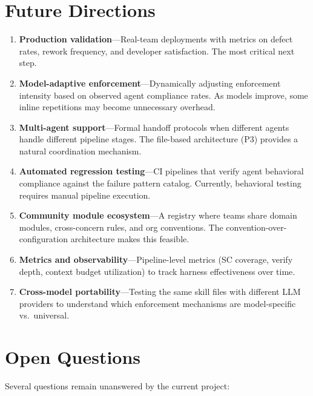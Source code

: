 \documentclass[11pt,a4paper,openright,twoside]{report}
\begin{document}
\section{Future Directions}

\begin{enumerate}
  \item \textbf{Production validation}---Real-team deployments with metrics on defect rates, rework frequency, and developer satisfaction. The most critical next step.
  \item \textbf{Model-adaptive enforcement}---Dynamically adjusting enforcement intensity based on observed agent compliance rates. As models improve, some inline repetitions may become unnecessary overhead.
  \item \textbf{Multi-agent support}---Formal handoff protocols when different agents handle different pipeline stages. The file-based architecture (P3) provides a natural coordination mechanism.
  \item \textbf{Automated regression testing}---CI pipelines that verify agent behavioral compliance against the failure pattern catalog. Currently, behavioral testing requires manual pipeline execution.
  \item \textbf{Community module ecosystem}---A registry where teams share domain modules, cross-concern rules, and org conventions. The convention-over-configuration architecture makes this feasible.
  \item \textbf{Metrics and observability}---Pipeline-level metrics (SC coverage, verify depth, context budget utilization) to track harness effectiveness over time.
  \item \textbf{Cross-model portability}---Testing the same skill files with different LLM providers to understand which enforcement mechanisms are model-specific vs.\ universal.
\end{enumerate}

\section{Open Questions}

Several questions remain unanswered by the current project:
\end{document}
